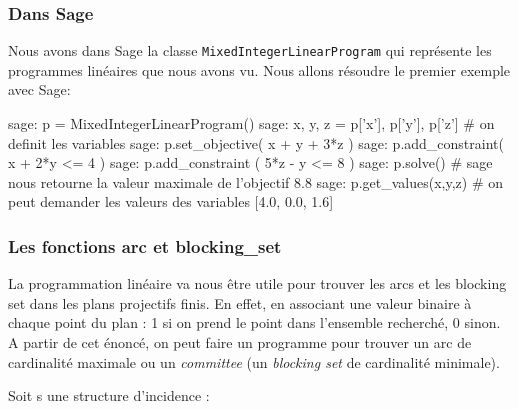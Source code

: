 \documentclass[a4paper]{article}
\begin{document}
\subsubsection*{Dans Sage}
Nous avons dans Sage la classe \texttt{MixedIntegerLinearProgram} qui représente les programmes linéaires que nous avons vu.
Nous allons résoudre le premier exemple avec Sage:
\begin{sageverbatim}
 sage: p = MixedIntegerLinearProgram()
 sage: x, y, z = p['x'], p['y'], p['z']    # on definit les variables
 sage: p.set_objective( x + y + 3*z )
 sage: p.add_constraint( x + 2*y <= 4 )
 sage: p.add_constraint ( 5*z - y <= 8 )
 sage: p.solve()         # sage nous retourne la valeur maximale de l'objectif
 8.8
 sage: p.get_values(x,y,z)    # on peut demander les valeurs des variables
 [4.0, 0.0, 1.6]
\end{sageverbatim}
\subsubsection*{Les fonctions arc et blocking\_set}
La programmation linéaire va nous être utile pour trouver les arcs et les blocking set dans les plans projectifs finis. En effet, en associant une valeur binaire à chaque point du plan : 1 si on prend le point dans l'ensemble recherché, 0 sinon.\\
A partir de cet énoncé, on peut faire un programme pour trouver un arc de cardinalité maximale ou un \textit{committee} (un \textit{blocking set} de cardinalité minimale).

Soit s une structure d'incidence :
\end{document}
